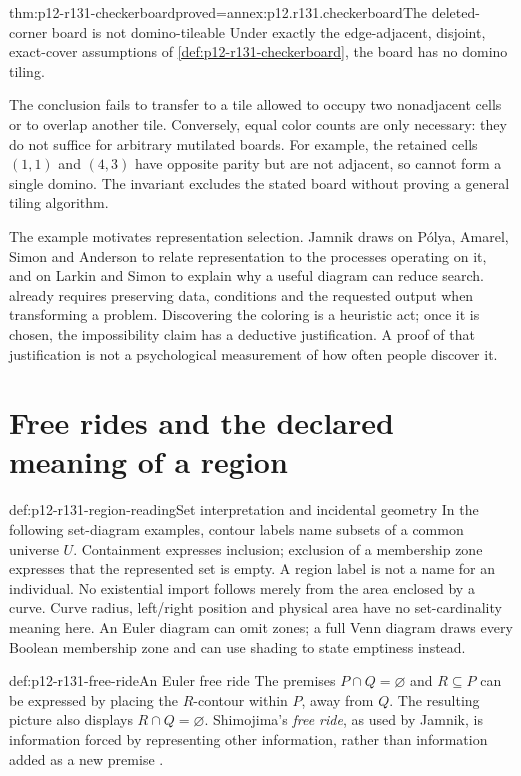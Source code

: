 \begin{hbtheorem}{thm:p12-r131-checkerboard}{proved=annex:p12.r131.checkerboard}{The deleted-corner board is not domino-tileable}
Under exactly the edge-adjacent, disjoint, exact-cover assumptions of
\cref{def:p12-r131-checkerboard}, the board has no domino tiling.
\end{hbtheorem}

The conclusion fails to transfer to a tile allowed to occupy two
nonadjacent cells or to overlap another tile. Conversely, equal color
counts are only necessary: they do not suffice for arbitrary mutilated
boards. For example, the retained cells \((1,1)\) and \((4,3)\) have
opposite parity but are not adjacent, so cannot form a single domino.
The invariant excludes the stated board without proving a general
tiling algorithm.

The example motivates representation selection. Jamnik draws on P\'olya,
Amarel, Simon and Anderson to relate representation to the processes
operating on it, and on Larkin and Simon to explain why a useful diagram
can reduce search.  already requires
preserving data, conditions and the requested output when transforming
a problem. Discovering the coloring is a heuristic act; once it is
chosen, the impossibility claim has a deductive justification. A proof
of that justification is not a psychological measurement of how often
people discover it.

\section{Free rides and the declared meaning of a region}

\begin{hbdefinition}{def:p12-r131-region-reading}{Set interpretation and incidental geometry}
In the following set-diagram examples, contour labels name subsets of
a common universe \(U\). Containment expresses inclusion; exclusion of
a membership zone expresses that the represented set is empty. A region
label is not a name for an individual. No existential import follows
merely from the area enclosed by a curve. Curve radius, left/right
position and physical area have no set-cardinality meaning here.
An Euler diagram can omit zones; a full Venn diagram draws every Boolean
membership zone and can use shading to state emptiness instead.
\end{hbdefinition}

\begin{hbexample}{def:p12-r131-free-ride}{An Euler free ride}
The premises \(P\cap Q=\varnothing\) and \(R\subseteq P\) can
be expressed by placing the \(R\)-contour within \(P\), away from
\(Q\). The resulting picture also displays \(R\cap Q=\varnothing\).
Shimojima's \emph{free ride}, as used by Jamnik, is information forced
by representing other information, rather than information added as a
new premise \cite[p.~717, fig.~13.1.3]{Jamnik2021LogicalDiagrams}.
\end{hbexample}

